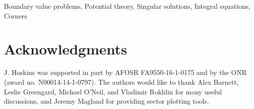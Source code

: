 \documentclass[12pt,times]{elsarticle}
\begin{document}
\begin{frontmatter}
\begin{keyword}
Boundary value problems, Potential theory, Singular solutions, Integral equations, Corners
\end{keyword}

\end{frontmatter}









\section{Acknowledgments}
J. Hoskins was supported in part by AFOSR FA9550-16-1-0175 and by the ONR (award no. N00014-14-1-0797).
The authors would like to thank Alex Barnett, Leslie Greengard, Michael O'Neil, and Vladimir Rokhlin for many useful discussions, and Jeremy Magland for providing sector plotting tools.

\appendix
\end{document}
